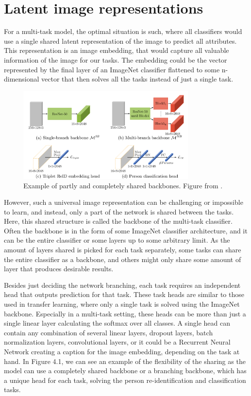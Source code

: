 \section{Latent image representations}
For a multi-task model, the optimal situation is such, where all classifiers would use a single shared latent representation of the image to predict all attributes.
This representation is an image embedding, that would capture all valuable information of the image for our tasks.
The embedding could be the vector represented by the final layer of an ImageNet classifier flattened to some n-dimensional vector that then solves all the tasks instead of just a single task.
\begin{figure}[h!] 
\centering 
\includegraphics[width=0.8\textwidth]{imgs/sharedBackbone.png}
\caption{Example of partly and completely shared backbones. Figure from \citep{visualPerson}.\label{fig:params}}
\end{figure}
However, such a universal image representation can be challenging or impossible to learn, and instead, only a part of the network is shared between the tasks.
Here, this shared structure is called the backbone of the multi-task classifier.
Often the backbone is in the form of some ImageNet classifier architecture, and it can be the entire classifier or some layers up to some arbitrary limit.
As the amount of layers shared is picked for each task separately, some tasks can share the entire classifier as a backbone, and others might only share some amount of layer that produces desirable results.

Besides just deciding the network branching, each task requires an independent head that outputs prediction for that task.
These task heads are similar to those used in transfer learning, where only a single task is solved using the ImageNet backbone.
Especially in a multi-task setting, these heads can be more than just a single linear layer calculating the softmax over all classes.
A single head can contain any combination of several linear layers, dropout layers, batch normalization layers, convolutional layers, or it could be a Recurrent Neural Network creating a caption for the image embedding, depending on the task at hand.
In Figure 4.1, we can see an example of the flexibility of the sharing as the model can use a completely shared backbone or a branching backbone, which has a unique head for each task, solving the person re-identification and classification tasks.

